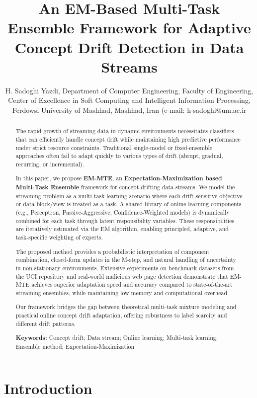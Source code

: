 \documentclass[12pt,a4paper]{article}
\title{\textbf{An EM-Based Multi-Task Ensemble Framework for Adaptive Concept Drift Detection in Data Streams}}
\author{H. Sadoghi Yazdi, Department of Computer Engineering, Faculty of Engineering, Center of Excellence in Soft Computing and Intelligent Information Processing, Ferdowsi University of Mashhad, Mashhad, Iran (e-mail: h-sadoghi@um.ac.ir}
\begin{document}
	
	\maketitle
	
	\begin{abstract}
		The rapid growth of streaming data in dynamic environments necessitates classifiers that can efficiently handle concept drift while maintaining high predictive performance under strict resource constraints. Traditional single-model or fixed-ensemble approaches often fail to adapt quickly to various types of drift (abrupt, gradual, recurring, or incremental).
		
		In this paper, we propose \textbf{EM-MTE}, an \textbf{Expectation-Maximization based Multi-Task Ensemble} framework for concept-drifting data streams. We model the streaming problem as a multi-task learning scenario where each drift-sensitive objective or data block/view is treated as a task. A shared library of online learning components (e.g., Perceptron, Passive-Aggressive, Confidence-Weighted models) is dynamically combined for each task through latent responsibility variables. These responsibilities are iteratively estimated via the EM algorithm, enabling principled, adaptive, and task-specific weighting of experts.
		
		The proposed method provides a probabilistic interpretation of component combination, closed-form updates in the M-step, and natural handling of uncertainty in non-stationary environments. Extensive experiments on benchmark datasets from the UCI repository and real-world malicious web page detection demonstrate that EM-MTE achieves superior adaptation speed and accuracy compared to state-of-the-art streaming ensembles, while maintaining low memory and computational overhead.
		
		Our framework bridges the gap between theoretical multi-task mixture modeling and practical online concept drift adaptation, offering robustness to label scarcity and different drift patterns.

		
		\medskip
		\noindent\textbf{Keywords:} Concept drift; Data stream; Online learning; Multi-task learning; Ensemble method; Expectation-Maximization
	\end{abstract}
	
	\section{Introduction}
	
\end{document}
